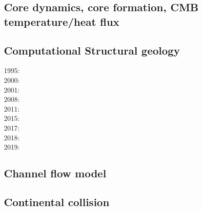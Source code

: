\subsection{Core dynamics, core formation, CMB temperature/heat flux}
 

\noindent
{\scriptsize
\cite{hayu96}
\cite{vayu98}
\cite{nata04c}
\cite{lahb08}\cite{gost08}\cite{sata08}
\cite{kisn09}
\cite{nata10}\cite{lamg10}\cite{sate10}
\cite{zhzh11}
\cite{cobu12}
\cite{nata13}
\cite{yiym19}
}

\subsection{Computational Structural geology}

\noindent
{\scriptsize
1995: \cite{fige95}\\
2000: \cite{acgf00}\cite{trla00}\\
2001: \cite{masc01}\\
2008: \cite{manc08}\cite{scsf08}\\
2011: \cite{frem11}\\
2015: \cite{pevp15}\\
2017: \cite{naam17}\cite{scdu17}\\
2018: \cite{naam18}\\
2019: \cite{llor19}\cite{yada19}
}

\subsection{Channel flow model} 

{\scriptsize
\cite{jabm04}
\cite{jabn06}\cite{mebe06}\cite{benj06}
\cite{jabn07}
\cite{jabe11}
}

\subsection*{Continental collision} 

